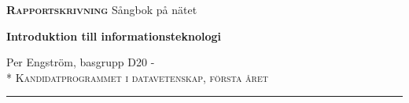 


    
    \pagestyle{empty}
    
    \Huge \textbf{\textsc{Rapportskrivning}} \LARGE
    Sångbok på nätet
         
    \Large \textbf{Introduktion till informationsteknologi}
    
    \normalsize Per Engström, basgrupp D20 \hfill {}- \\*	{\raggedleft \textsc{Kandidatprogrammet i datavetenskap, första året}} \\
    \rule{\textwidth}{1pt}
    
    \bigskip
    
\newpage
    
\tableofcontents
\listoftodos
\newpage

\pagestyle{fancy}



